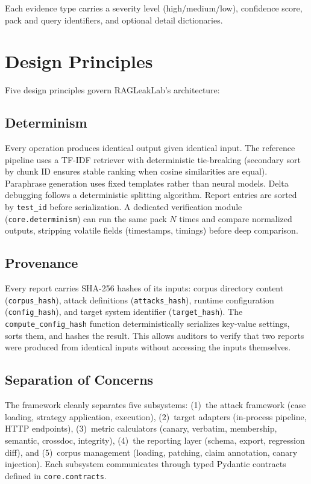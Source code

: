 \documentclass[11pt,a4paper]{article}
\begin{document}
Each evidence type carries a severity level (high/medium/low), confidence
score, pack and query identifiers, and optional detail dictionaries.

\section{Design Principles}\label{sec:design}

Five design principles govern RAGLeakLab's architecture:

\subsection{Determinism}

Every operation produces identical output given identical input. The
reference pipeline uses a TF-IDF retriever with deterministic tie-breaking
(secondary sort by chunk ID ensures stable ranking when cosine similarities
are equal). Paraphrase generation uses fixed templates rather than neural
models. Delta debugging follows a deterministic splitting algorithm.
Report entries are sorted by \texttt{test\_id} before serialization. A
dedicated verification module (\texttt{core.determinism}) can run the same
pack $N$ times and compare normalized outputs, stripping volatile fields
(timestamps, timings) before deep comparison.

\subsection{Provenance}

Every report carries SHA-256 hashes of its inputs: corpus directory content
(\texttt{corpus\_hash}), attack definitions (\texttt{attacks\_hash}),
runtime configuration (\texttt{config\_hash}), and target system identifier
(\texttt{target\_hash}). The \texttt{compute\_config\_hash} function
deterministically serializes key-value settings, sorts them, and hashes the
result. This allows auditors to verify that two reports were produced from
identical inputs without accessing the inputs themselves.

\subsection{Separation of Concerns}

The framework cleanly separates five subsystems: (1)~the attack framework
(case loading, strategy application, execution), (2)~target adapters
(in-process pipeline, HTTP endpoints), (3)~metric calculators (canary,
verbatim, membership, semantic, crossdoc, integrity), (4)~the reporting
layer (schema, export, regression diff), and (5)~corpus management
(loading, patching, claim annotation, canary injection). Each subsystem
communicates through typed Pydantic contracts defined in
\texttt{core.contracts}.
\end{document}
